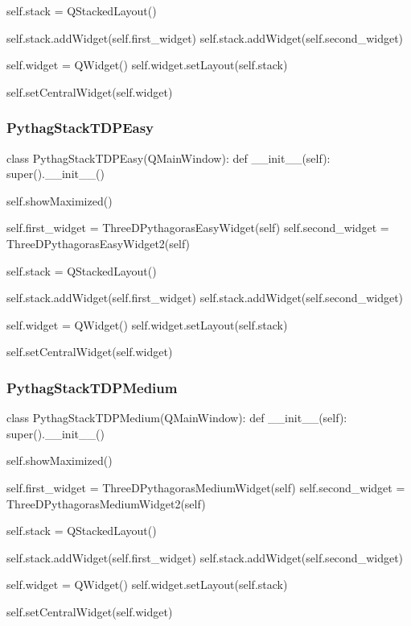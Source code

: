 \begin{landscape}
\begin{python}
        self.stack = QStackedLayout()

        self.stack.addWidget(self.first_widget)
        self.stack.addWidget(self.second_widget)

        self.widget = QWidget()
        self.widget.setLayout(self.stack)

        self.setCentralWidget(self.widget)
\end{python}

\subsubsection{PythagStackTDPEasy}

\begin{python}
class PythagStackTDPEasy(QMainWindow):
    def __init__(self):
        super().__init__()

        self.showMaximized()

        self.first_widget = ThreeDPythagorasEasyWidget(self)
        self.second_widget = ThreeDPythagorasEasyWidget2(self)

        self.stack = QStackedLayout()

        self.stack.addWidget(self.first_widget)
        self.stack.addWidget(self.second_widget)

        self.widget = QWidget()
        self.widget.setLayout(self.stack)

        self.setCentralWidget(self.widget)
\end{python}

\subsubsection{PythagStackTDPMedium}

\begin{python}
class PythagStackTDPMedium(QMainWindow):
    def __init__(self):
        super().__init__()

        self.showMaximized()

        self.first_widget = ThreeDPythagorasMediumWidget(self)
        self.second_widget = ThreeDPythagorasMediumWidget2(self)

        self.stack = QStackedLayout()

        self.stack.addWidget(self.first_widget)
        self.stack.addWidget(self.second_widget)

        self.widget = QWidget()
        self.widget.setLayout(self.stack)

        self.setCentralWidget(self.widget)
\end{python}


\end{landscape}

